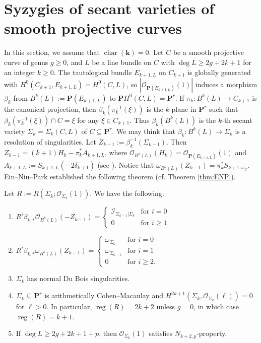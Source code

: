 \documentclass[graybox]{svmult}
\newcommand{\kk}{\mathbf{k}}
\newcommand{\sO}{\mathscr{O}}
\newcommand{\sI}{\mathscr{I}}
\def\nP{\mathbf{P}}
\def\reg{\operatorname{reg}}
\begin{document}
\section{Syzygies of secant varieties of smooth projective curves}\label{sec:secant}
In this section, we assume that $\operatorname{char}(\kk) = 0$. Let $C$ be a smooth projective curve of genus $g \geq 0$, and $L$ be a line bundle on $C$ with $\deg L \geq 2g+2k+1$ for an integer $k \geq 0$. The tautological bundle $E_{k+1, L}$ on $C_{k+1}$ is globally generated with $H^0(C_{k+1}, E_{k+1,L}) = H^0(C,L)$, so $|\sO_{\nP(E_{k+1,L})}(1)|$ induces a morphism $\beta_k$ from $B^k(L):=\nP(E_{k+1,L})$ to $\nP H^0(C,L) = \nP^r$. If $\pi_k \colon B^k(L) \to C_{k+1}$ is the canonical projection, then $\beta_k(\pi_k^{-1}(\xi))$ is the $k$-plane in $\nP^r$ such that $\beta_k(\pi_k^{-1}(\xi)) \cap C = \xi$ for any $\xi \in C_{k+1}$. Thus $\beta_k(B^k(L))$ is the $k$-th secant variety $\Sigma_k=\Sigma_k(C, L)$ of $C \subseteq \nP^r$. We may think that $\beta_k \colon B^k(L) \to \Sigma_k$ is a resolution of singularities. Let $Z_{k-1}:=\beta_k^{-1}(\Sigma_{k-1})$. Then $Z_{k-1}= (k+1)H_k - \pi_k^* A_{k+1,L}$, where $\sO_{B^k(L)}(H_k) = \sO_{\nP(E_{k+1,L})}(1)$ and $A_{k+1,L}:=S_{k+1,L}(-2\delta_{k+1})$ (see \cite[Proposition 3.15]{ENP1}). Notice that $\omega_{B^k(L)}(Z_{k-1}) = \pi_k^* S_{k+1, \omega_C}$.
Ein--Niu--Park \cite{ENP1} established the following theorem (cf. Theorem \ref{thm:ENP}).

\begin{theorem}\label{thm:secant} Let $R:=R(\Sigma_k; \sO_{\Sigma_k}(1))$. We have the following:
\begin{enumerate}
\item[$(a)$] $R^i \beta_{k,*}\sO_{B^k(L)}(-Z_{k-1})=\begin{cases} \sI_{\Sigma_{k-1}|\Sigma_k} & \text{for $i=0$} \\ 0 & \text{for $i \geq 1$}. \end{cases}$
\item[$(b)$] $R^i \beta_{k,*}\omega_{B^k(L)}(Z_{k-1}) = \begin{cases} \omega_{\Sigma_k} & \text{for $i=0$} \\ \omega_{\Sigma_{k-1}} & \text{for $i=1$} \\ 0 & \text{for $i \geq 2$}. \end{cases}$
\item[$(c)$] $\Sigma_k$ has normal Du Bois singularities.
\item[$(d)$] $\Sigma_k \subseteq \nP^r$ is arithmetically Cohen--Macaulay and $H^{2k+1}(\Sigma_k, \sO_{\Sigma_k}(\ell))=0$ for $\ell>0$. In particular, $\reg(R)=2k+2$ unless $g=0$, in which case $\reg(R)=k+1$.
\item[$(e)$] If $\deg L \geq 2g+2k+1+p$, then $\sO_{\Sigma_k}(1)$ satisfies $N_{k+2,p}$-property.
\end{enumerate}
\end{theorem}
\end{document}
